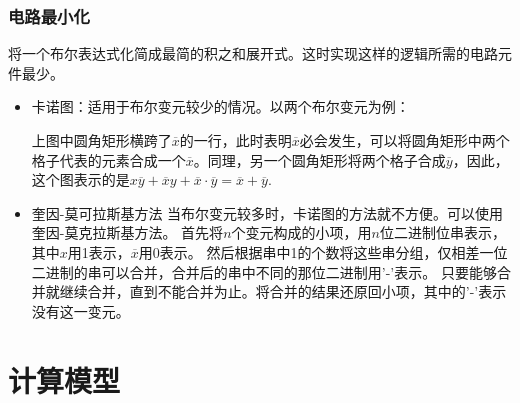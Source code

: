 \subsubsection*{电路最小化}
将一个布尔表达式化简成最简的积之和展开式。这时实现这样的逻辑所需的电路元件最少。

\begin{itemize}
    \item 卡诺图：适用于布尔变元较少的情况。以两个布尔变元为例：
    \begin{center}
    \end{center}

    上图中圆角矩形横跨了$\overline x$的一行，此时表明$\overline x$必会发生，可以将圆角矩形中两个格子代表的元素合成一个$\overline x$。同理，另一个圆角矩形将两个格子合成$\overline y$，因此，这个图表示的是$x \overline y + \overline x y + \overline x \cdot \overline y = \overline x + \overline y$.

    \item 奎因-莫可拉斯基方法
    当布尔变元较多时，卡诺图的方法就不方便。可以使用奎因-莫克拉斯基方法。
    首先将$n$个变元构成的小项，用$n$位二进制位串表示，其中$x$用1表示，$\overline x$用0表示。
    然后根据串中1的个数将这些串分组，仅相差一位二进制的串可以合并，合并后的串中不同的那位二进制用'-'表示。
    只要能够合并就继续合并，直到不能合并为止。将合并的结果还原回小项，其中的'-'表示没有这一变元。
\end{itemize}

\section{计算模型}
